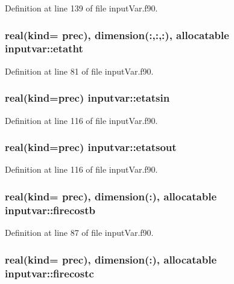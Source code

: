 Definition at line 139 of file input\-Var.\-f90.

\hypertarget{classinputvar_a93c858e92300ce7dfc06627cbc72d681}{
\subsubsection[{etatht}]{\setlength{\rightskip}{0pt plus 5cm}real(kind= prec), dimension(\-:,\-:,\-:), allocatable inputvar\-::etatht}}\label{classinputvar_a93c858e92300ce7dfc06627cbc72d681}


Definition at line 81 of file input\-Var.\-f90.

\hypertarget{classinputvar_ad3f2c5423c51b51ac0cc6460154eab83}{
\subsubsection[{etatsin}]{\setlength{\rightskip}{0pt plus 5cm}real(kind=prec) inputvar\-::etatsin}}\label{classinputvar_ad3f2c5423c51b51ac0cc6460154eab83}


Definition at line 116 of file input\-Var.\-f90.

\hypertarget{classinputvar_a1855fdf34565c8a9555f350ae7958ecd}{
\subsubsection[{etatsout}]{\setlength{\rightskip}{0pt plus 5cm}real(kind=prec) inputvar\-::etatsout}}\label{classinputvar_a1855fdf34565c8a9555f350ae7958ecd}


Definition at line 116 of file input\-Var.\-f90.

\hypertarget{classinputvar_a1560f8312d0c0606566ee8f7e21c1e49}{
\subsubsection[{firecostb}]{\setlength{\rightskip}{0pt plus 5cm}real(kind= prec), dimension(\-:), allocatable inputvar\-::firecostb}}\label{classinputvar_a1560f8312d0c0606566ee8f7e21c1e49}


Definition at line 87 of file input\-Var.\-f90.

\hypertarget{classinputvar_afa2d0c05087f3cda5d3e984037a2a354}{
\subsubsection[{firecostc}]{\setlength{\rightskip}{0pt plus 5cm}real(kind= prec), dimension(\-:), allocatable inputvar\-::firecostc}}\label{classinputvar_afa2d0c05087f3cda5d3e984037a2a354}


